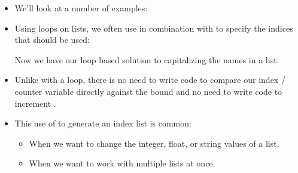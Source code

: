 \documentclass[letterpaper,10pt,english]{sphinxmanual}
\begin{document}
\begin{itemize}
\begin{itemize}
\end{itemize}

\item {} 
We’ll look at a number of examples:

\begin{sphinxVerbatim}[commandchars=\\\{\}]
 
  
  
\end{sphinxVerbatim}

\item {} 
Using  loops on lists, we often use  in
combination with  to specify the indices that should be
used:

\begin{sphinxVerbatim}[commandchars=\\\{\}]
 
       
        \PYG{p}{[}\PYG{p}{]}  \PYG{p}{[}\PYG{p}{]}
\end{sphinxVerbatim}

Now we have our  loop based solution to capitalizing the
names in a list.

\item {} 
Unlike with a  loop, there is no need to write code to
compare our index / counter variable  directly against the
bound and no need to write code to increment .

\item {} 
This use of  to generate an index list is common:
\begin{itemize}
\item {} 
When we want to change the integer, float, or string values of a
list.

\item {} 
When we want to work with multiple lists at once.

\end{itemize}

\end{itemize}
\end{document}

